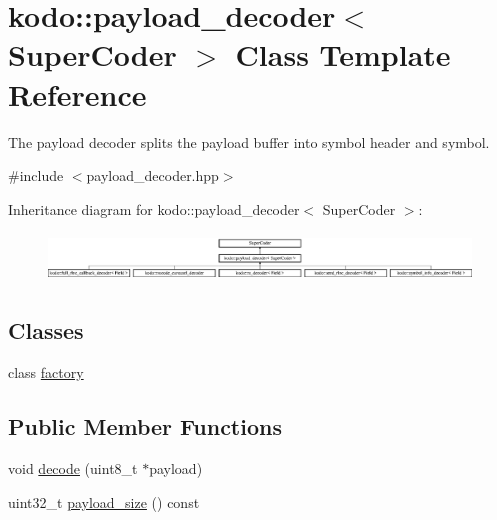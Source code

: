 \hypertarget{classkodo_1_1payload__decoder}{\section{kodo\-:\-:payload\-\_\-decoder$<$ Super\-Coder $>$ Class Template Reference}
\label{classkodo_1_1payload__decoder}
}


The payload decoder splits the payload buffer into symbol header and symbol.  




{\ttfamily \#include $<$payload\-\_\-decoder.\-hpp$>$}

Inheritance diagram for kodo\-:\-:payload\-\_\-decoder$<$ Super\-Coder $>$\-:\begin{figure}[H]
\begin{center}
\leavevmode
\includegraphics[height=1.297297cm]{classkodo_1_1payload__decoder}
\end{center}
\end{figure}
\subsection*{Classes}
\begin{DoxyCompactItemize}
\item 
class \hyperlink{classkodo_1_1payload__decoder_1_1factory}{factory}
\end{DoxyCompactItemize}
\subsection*{Public Member Functions}
\begin{DoxyCompactItemize}
\item 
void \hyperlink{classkodo_1_1payload__decoder_a004c96d9eeb56d4e338bb12e04ba51aa}{decode} (uint8\-\_\-t $\ast$payload)
\begin{DoxyCompactList}\small\item\em \end{DoxyCompactList}\item 
uint32\-\_\-t \hyperlink{classkodo_1_1payload__decoder_ab951b47cd85fea514bb4c7c999c3e675}{payload\-\_\-size} () const 
\begin{DoxyCompactList}\small\item\em \end{DoxyCompactList}\end{DoxyCompactItemize}


